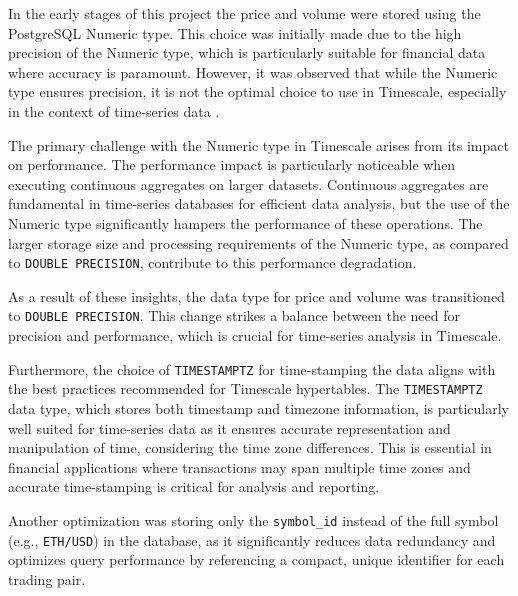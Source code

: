 In the early stages of this project the price and volume were stored using the PostgreSQL Numeric type. This choice was initially made due to the high precision of the Numeric type, which is particularly suitable for financial data where accuracy is paramount. However, it was observed that while the Numeric type ensures precision, it is not the optimal choice to use in Timescale, especially in the context of time-series data \cite{timescale_best_practices}. \newline

The primary challenge with the Numeric type in Timescale arises from its impact on performance. The performance impact is particularly noticeable when executing continuous aggregates on larger datasets. Continuous aggregates are fundamental in time-series databases for efficient data analysis, but the use of the Numeric type significantly hampers the performance of these operations. The larger storage size and processing requirements of the Numeric type, as compared to \texttt{DOUBLE PRECISION}, contribute to this performance degradation. \newline

As a result of these insights, the data type for price and volume was transitioned to \texttt{DOUBLE PRECISION}. This change strikes a balance between the need for precision and performance, which is crucial for time-series analysis in Timescale. \newline

Furthermore, the choice of \texttt{TIMESTAMPTZ} for time-stamping the data aligns with the best practices recommended for Timescale hypertables. The \texttt{TIMESTAMPTZ} data type, which stores both timestamp and timezone information, is particularly well suited for time-series data as it ensures accurate representation and manipulation of time, considering the time zone differences. This is essential in financial applications where transactions may span multiple time zones and accurate time-stamping is critical for analysis and reporting. \newline

Another optimization was storing only the \texttt{symbol\_id} instead of the full symbol (e.g., \texttt{ETH/USD}) in the database, as it significantly reduces data redundancy and optimizes query performance by referencing a compact, unique identifier for each trading pair.  


